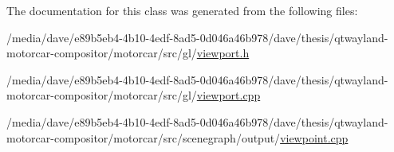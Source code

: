 The documentation for this class was generated from the following files\-:\begin{DoxyCompactItemize}
\item 
/media/dave/e89b5eb4-\/4b10-\/4edf-\/8ad5-\/0d046a46b978/dave/thesis/qtwayland-\/motorcar-\/compositor/motorcar/src/gl/\hyperlink{viewport_8h}{viewport.\-h}\item 
/media/dave/e89b5eb4-\/4b10-\/4edf-\/8ad5-\/0d046a46b978/dave/thesis/qtwayland-\/motorcar-\/compositor/motorcar/src/gl/\hyperlink{viewport_8cpp}{viewport.\-cpp}\item 
/media/dave/e89b5eb4-\/4b10-\/4edf-\/8ad5-\/0d046a46b978/dave/thesis/qtwayland-\/motorcar-\/compositor/motorcar/src/scenegraph/output/\hyperlink{viewpoint_8cpp}{viewpoint.\-cpp}\end{DoxyCompactItemize}
